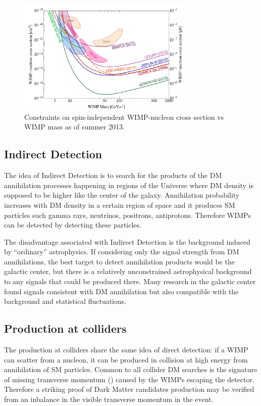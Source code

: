 \begin{figure}[p]
\centering
\includegraphics[width=0.75\textwidth]{DarkMatter/WIMPcs}
\caption{Constraints on spin-independent WIMP-nucleon cross section vs WIMP mass as of summer 2013.}
\label{fig:WIMPcs}
\end{figure}

\subsection{Indirect Detection}
The idea of Indirect Detection is to search for the products of the DM annihilation processes  happening in regions of the Universe where DM density is supposed to be higher like the center of the galaxy. Annihilation probability increases with DM density in a certain region of space and it produces SM particles such gamma rays, neutrinos, positrons, antiprotons. Therefore WIMPs can be detected by detecting these particles.

The disadvantage associated with Indirect Detection is the background induced by ``ordinary'' astrophysics. If considering only the signal strength from DM annihilations, the best target to detect annihilation products would be the galactic center, but there is a relatively unconstrained astrophysical background to any signals that could be produced there. Many research in the galactic center found signals consistent with DM annihilation but also compatible with the background and statistical fluctuations.

\subsection{Production at colliders}
The production at colliders share the same idea of direct detection: if a WIMP can scatter from a nucleon, it can be produced in \pp collision at high energy from annihilation of SM particles. Common to all collider DM searches is the signature of missing transverse momentum (\met) caused by the WIMPs escaping the detector. Therefore a striking proof of Dark Matter candidates production may be verified from an inbalance in the visible transverse momentum in the event.


